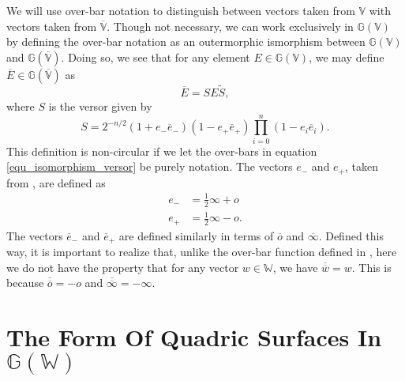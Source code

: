 \documentclass{birkjour}
\theoremstyle{definition}
\theoremstyle{remark}
\numberwithin{equation}{section}
\newcommand{\G}{\mathbb{G}}
\newcommand{\V}{\mathbb{V}}
\newcommand{\Vb}{\mathbb{\overline{V}}}
\newcommand{\W}{\mathbb{W}}
\newcommand{\nvao}{o}
\newcommand{\nvai}{\infty}
\newcommand{\nvaob}{\overline{o}}
\newcommand{\nvaib}{\overline{\infty}}
\newcommand{\eminus}{e_{-}}
\newcommand{\eplus}{e_{+}}
\newcommand{\eminusb}{\overline{e}_{-}}
\newcommand{\eplusb}{\overline{e}_{+}}
\begin{document}
We will use over-bar notation to distinguish between vectors taken from $\V$
with vectors taken from $\Vb$.  Though not necessary, we can work exclusively
in $\G(\V)$ by defining the over-bar notation as an outermorphic ismorphism between
$\G(\V)$ and $\G(\Vb)$.  Doing so, we see that for any element $E\in\G(\V)$,
we may define $\overline{E}\in\G(\Vb)$ as
\begin{equation}
\overline{E} = SE\tilde{S},
\end{equation}
where $S$ is the versor given by
\begin{equation}\label{equ_isomorphism_versor}
S = 2^{-n/2}(1+\eminus\eminusb)(1-\eplus\eplusb)\prod_{i=0}^n(1-e_i\overline{e}_i).
\end{equation}
This definition is non-circular if we let the over-bars in equation \eqref{equ_isomorphism_versor}
be purely notation.  The vectors $\eminus$ and $\eplus$, taken from \cite{LiRockwood},
are defined as
\begin{align}
\eminus &= \frac{1}{2}\nvai + \nvao \\
\eplus &= \frac{1}{2}\nvai - \nvao.
\end{align}
The vectors $\eminusb$ and $\eplusb$ are defined similarly in terms of $\nvaob$ and $\nvaib$.
Defined this way, it is important to realize that, unlike the over-bar function defined in \cite{Parkin12},
here we do not have the property that for any vector $w\in\W$, we have $\overline{\overline{w}}=w$.
This is because $\overline{\nvaob}=-\nvao$ and $\overline{\nvaib}=-\nvai$.

\section{The Form Of Quadric Surfaces In $\G(\W)$}
\end{document}
